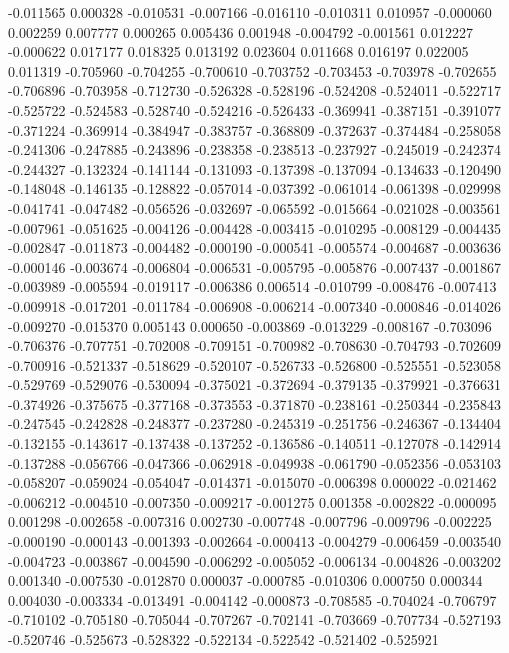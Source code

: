 -0.011565
0.000328
-0.010531
-0.007166
-0.016110
-0.010311
0.010957
-0.000060
0.002259
0.007777
0.000265
0.005436
0.001948
-0.004792
-0.001561
0.012227
-0.000622
0.017177
0.018325
0.013192
0.023604
0.011668
0.016197
0.022005
0.011319
-0.705960
-0.704255
-0.700610
-0.703752
-0.703453
-0.703978
-0.702655
-0.706896
-0.703958
-0.712730
-0.526328
-0.528196
-0.524208
-0.524011
-0.522717
-0.525722
-0.524583
-0.528740
-0.524216
-0.526433
-0.369941
-0.387151
-0.391077
-0.371224
-0.369914
-0.384947
-0.383757
-0.368809
-0.372637
-0.374484
-0.258058
-0.241306
-0.247885
-0.243896
-0.238358
-0.238513
-0.237927
-0.245019
-0.242374
-0.244327
-0.132324
-0.141144
-0.131093
-0.137398
-0.137094
-0.134633
-0.120490
-0.148048
-0.146135
-0.128822
-0.057014
-0.037392
-0.061014
-0.061398
-0.029998
-0.041741
-0.047482
-0.056526
-0.032697
-0.065592
-0.015664
-0.021028
-0.003561
-0.007961
-0.051625
-0.004126
-0.004428
-0.003415
-0.010295
-0.008129
-0.004435
-0.002847
-0.011873
-0.004482
-0.000190
-0.000541
-0.005574
-0.004687
-0.003636
-0.000146
-0.003674
-0.006804
-0.006531
-0.005795
-0.005876
-0.007437
-0.001867
-0.003989
-0.005594
-0.019117
-0.006386
0.006514
-0.010799
-0.008476
-0.007413
-0.009918
-0.017201
-0.011784
-0.006908
-0.006214
-0.007340
-0.000846
-0.014026
-0.009270
-0.015370
0.005143
0.000650
-0.003869
-0.013229
-0.008167
-0.703096
-0.706376
-0.707751
-0.702008
-0.709151
-0.700982
-0.708630
-0.704793
-0.702609
-0.700916
-0.521337
-0.518629
-0.520107
-0.526733
-0.526800
-0.525551
-0.523058
-0.529769
-0.529076
-0.530094
-0.375021
-0.372694
-0.379135
-0.379921
-0.376631
-0.374926
-0.375675
-0.377168
-0.373553
-0.371870
-0.238161
-0.250344
-0.235843
-0.247545
-0.242828
-0.248377
-0.237280
-0.245319
-0.251756
-0.246367
-0.134404
-0.132155
-0.143617
-0.137438
-0.137252
-0.136586
-0.140511
-0.127078
-0.142914
-0.137288
-0.056766
-0.047366
-0.062918
-0.049938
-0.061790
-0.052356
-0.053103
-0.058207
-0.059024
-0.054047
-0.014371
-0.015070
-0.006398
0.000022
-0.021462
-0.006212
-0.004510
-0.007350
-0.009217
-0.001275
0.001358
-0.002822
-0.000095
0.001298
-0.002658
-0.007316
0.002730
-0.007748
-0.007796
-0.009796
-0.002225
-0.000190
-0.000143
-0.001393
-0.002664
-0.000413
-0.004279
-0.006459
-0.003540
-0.004723
-0.003867
-0.004590
-0.006292
-0.005052
-0.006134
-0.004826
-0.003202
0.001340
-0.007530
-0.012870
0.000037
-0.000785
-0.010306
0.000750
0.000344
0.004030
-0.003334
-0.013491
-0.004142
-0.000873
-0.708585
-0.704024
-0.706797
-0.710102
-0.705180
-0.705044
-0.707267
-0.702141
-0.703669
-0.707734
-0.527193
-0.520746
-0.525673
-0.528322
-0.522134
-0.522542
-0.521402
-0.525921
